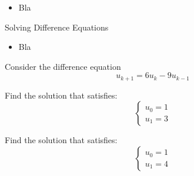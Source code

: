 \begin{lesson}

	\begin{itemize}
		\item Bla
	\end{itemize}
	

\end{lesson}


%
%
%
%
%
%
%
%











%
%



\begin{module}{Solving Difference Equations}
	\label{diff:solve}

	
	
\end{module}



\begin{lesson}

	\begin{itemize}
		\item Bla
	\end{itemize}
	

\end{lesson}


\newpage


\question	
	Consider the difference equation
	$$	u_{k+1} = 6 u_k - 9u_{k-1}	$$
	
\begin{parts}
	\item Find the solution that satisfies:
		$$ \begin{cases}
			u_0 = 1 \\
			u_1 = 3	
  		\end{cases} $$

	\item Find the solution that satisfies:
		$$ \begin{cases}
			u_0 = 1 \\
			u_1 = 4	
  		\end{cases} $$
\end{parts}



